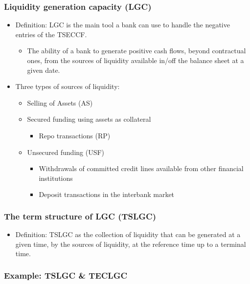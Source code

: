 \subsubsection{Liquidity generation capacity (LGC)}
\begin{itemize}
\item Definition: LGC is the main tool a bank can use to handle the negative entries of the TSECCF.
    \begin{itemize}
    \item The ability of a bank to generate positive cash flows, beyond contractual ones, from the sources of liquidity available in/off the balance sheet at a given date.
    \end{itemize}
\item Three types of sources of liquidity:
    \begin{itemize}
    \item Selling of Assets (AS)
    \item Secured funding using assets as collateral
        \begin{itemize}
        \item Repo transactions (RP)
        \end{itemize}
    
    \item Unsecured funding (USF)
        \begin{itemize}
        \item Withdrawals of committed credit lines available from other financial institutions
        \item Deposit transactions in the interbank market
        \end{itemize}
    \end{itemize}
\end{itemize}




\subsubsection{The term structure of LGC (TSLGC)}
\begin{itemize}
  \item Definition: TSLGC as the collection of liquidity that can be generated at a given time, by the sources of liquidity, at the reference time up to a terminal time.
\end{itemize}


\subsubsection{Example: TSLGC \& TECLGC}

